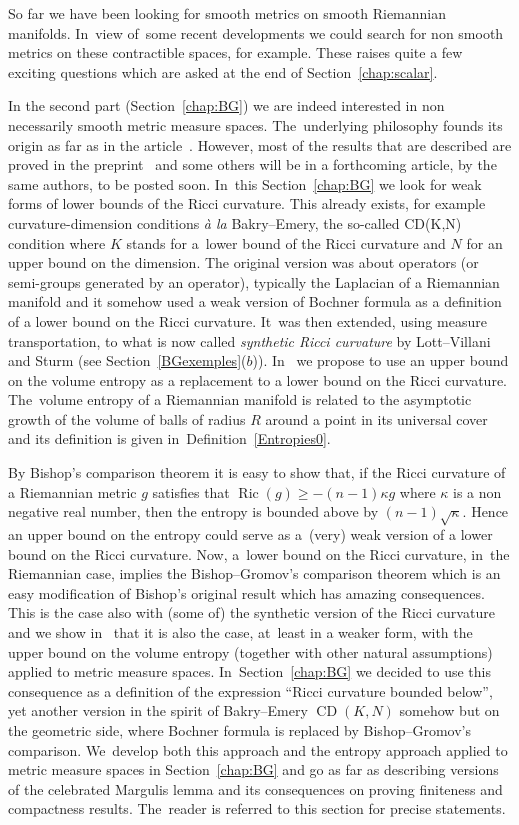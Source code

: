 \documentclass[10pt,a4paper]{amsart}
\numberwithin{equation}{section}
\newcommand{\CDCD}{\operatorname{CD}}
\newcommand{\Ric}{\operatorname{Ric}}
\begin{document}
So far we have been looking for smooth metrics on smooth Riemannian manifolds. In~view of~some recent developments we could search for non smooth metrics on these contractible spaces, for example. These raises quite a few exciting questions which are asked at the end of Section~\ref{chap:scalar}.

In the second part (Section~\ref{chap:BG}) we are indeed interested in non necessarily smooth metric measure spaces. The~underlying philosophy founds its origin as far as in the article~\cite{BCG-GAFA}. However, most of the results that are described are proved in the preprint~\cite{BCGS} and some others will be in a forthcoming article, by the same authors, to be posted soon. In~this Section~\ref{chap:BG} we look for weak forms of lower bounds of the Ricci curvature. This already exists, for example curvature-dimension conditions \textit{\`a la} Bakry--Emery, the so-called CD(K,N) condition where $K$ stands for a~lower bound of the Ricci curvature and $N$ for an upper bound on the dimension. The original version was about operators (or semi-groups generated by an operator), typically the Laplacian of a Riemannian manifold and it somehow used a weak version of Bochner formula as a definition of a lower bound on the Ricci curvature. It~was then extended, using measure transportation, to what is now called
\textit{synthetic Ricci curvature} by Lott--Villani and Sturm (see Section~\ref{BGexemples}($b$)). In~\cite{BCGS} we propose to use an upper bound on the volume entropy as a replacement to a lower bound on the Ricci curvature. The~volume entropy of a Riemannian manifold is related to the asymptotic growth of the volume of balls of radius $R$ around a point in its universal cover and its definition is given in~Definition~\ref{Entropies0}.

By Bishop's comparison theorem it is easy to show that, if the Ricci curvature of a Riemannian metric $g$ satisfies that $\Ric (g)\geq -(n-1)\kappa g$ where $\kappa$ is a non negative real number, then the entropy is bounded above by $(n-1)\sqrt \kappa$. Hence an upper bound on the entropy could serve as a~(very) weak version of a lower bound on the Ricci curvature. Now, a~lower bound on the Ricci curvature, in~the Riemannian case, implies the Bishop--Gromov's comparison theorem which is an easy modification of Bishop's original result which has amazing consequences. This is the case also with (some of) the synthetic version of the Ricci curvature and we show in~\cite{BCGS} that it is also the case, at~least in a weaker form, with the upper bound on the volume entropy (together with other natural assumptions) applied to metric measure spaces. In~Section~\ref{chap:BG} we decided to use this consequence as a definition of the expression
``Ricci curvature bounded below'', yet another version in the spirit of Bakry--Emery $\CDCD(K,N)$ somehow but on the geometric side, where Bochner formula is replaced by Bishop--Gromov's comparison. We~develop both this
approach and the entropy approach applied to metric measure spaces in Section~\ref{chap:BG} and go as far as describing versions of the celebrated Margulis lemma and its consequences on proving finiteness and compactness results. The~reader is referred to this section for precise statements.
\end{document}
